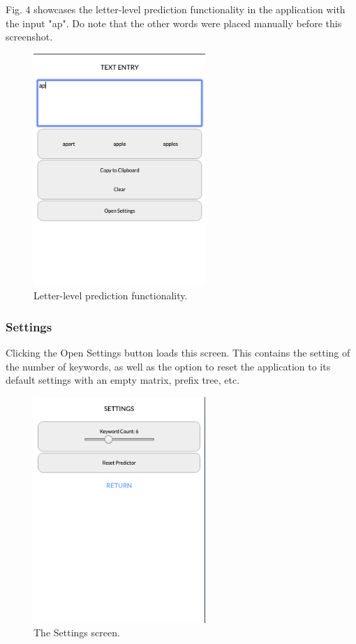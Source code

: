 \documentclass[journal]{./IEEE/IEEEtran}
\begin{document}
Fig. 4 showcases the letter-level prediction functionality in the application with the input "ap". Do note that the other words were placed manually before this screenshot.

\begin{figure}[!ht]
\begin{center}

\includegraphics[width=65mm]{images/text-level-prediction.png}
\caption{Letter-level prediction functionality.}

\end{center}
\end{figure}

\subsubsection{Settings}
Clicking the Open Settings button loads this screen. This contains the setting of the number of keywords, as well as the option to reset the application to its default settings with an empty matrix, prefix tree, etc.

\begin{figure}[!ht]
\begin{center}

\includegraphics[width=65mm]{images/settings.png}
\caption{The Settings screen.}

\end{center}
\end{figure}
\end{document}
